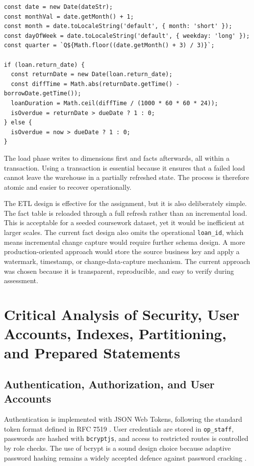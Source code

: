 \documentclass[12pt,a4paper]{article}
\begin{document}
\begin{lstlisting}[style=reportcode,caption={Transformation logic for time and loan measures}]
const date = new Date(dateStr);
const monthVal = date.getMonth() + 1;
const month = date.toLocaleString('default', { month: 'short' });
const dayOfWeek = date.toLocaleString('default', { weekday: 'long' });
const quarter = `Q${Math.floor((date.getMonth() + 3) / 3)}`;

if (loan.return_date) {
  const returnDate = new Date(loan.return_date);
  const diffTime = Math.abs(returnDate.getTime() - borrowDate.getTime());
  loanDuration = Math.ceil(diffTime / (1000 * 60 * 60 * 24));
  isOverdue = returnDate > dueDate ? 1 : 0;
} else {
  isOverdue = now > dueDate ? 1 : 0;
}
\end{lstlisting}

The load phase writes to dimensions first and facts afterwards, all within a transaction. Using a transaction is essential because it ensures that a failed load cannot leave the warehouse in a partially refreshed state. The process is therefore atomic and easier to recover operationally.

The ETL design is effective for the assignment, but it is also deliberately simple. The fact table is reloaded through a full refresh rather than an incremental load. This is acceptable for a seeded coursework dataset, yet it would be inefficient at larger scales. The current fact design also omits the operational \texttt{loan\_id}, which means incremental change capture would require further schema design. A more production-oriented approach would store the source business key and apply a watermark, timestamp, or change-data-capture mechanism. The current approach was chosen because it is transparent, reproducible, and easy to verify during assessment.

\section{Critical Analysis of Security, User Accounts, Indexes, Partitioning, and Prepared Statements}

\subsection{Authentication, Authorization, and User Accounts}
Authentication is implemented with JSON Web Tokens, following the standard token format defined in RFC 7519 \citep{jones2015}. User credentials are stored in \texttt{op\_staff}, passwords are hashed with \texttt{bcryptjs}, and access to restricted routes is controlled by role checks. The use of bcrypt is a sound design choice because adaptive password hashing remains a widely accepted defence against password cracking \citep{provos1999}.
\end{document}
